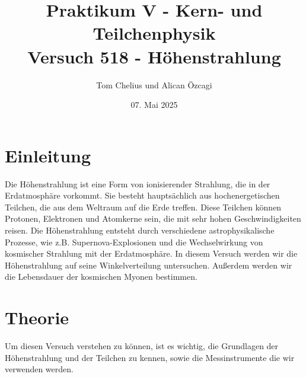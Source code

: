\documentclass{article}
\title{Praktikum V - Kern- und Teilchenphysik\\Versuch 518 - Höhenstrahlung}
\author{Tom Chelius und Alican Özcagi}
\date{07. Mai 2025}
\begin{document}
\maketitle
\newpage
\tableofcontents

\newpage

\section{Einleitung}
Die Höhenstrahlung ist eine Form von ionisierender Strahlung, die in der Erdatmosphäre vorkommt. 
Sie besteht hauptsächlich aus hochenergetischen Teilchen, die aus dem Weltraum auf die Erde treffen. 
Diese Teilchen können Protonen, Elektronen und Atomkerne sein, die mit sehr hohen Geschwindigkeiten reisen. 
Die Höhenstrahlung entsteht durch verschiedene astrophysikalische Prozesse, wie z.B. Supernova-Explosionen und 
die Wechselwirkung von kosmischer Strahlung mit der Erdatmosphäre.
In diesem Versuch werden wir die Höhenstrahlung auf seine Winkelverteilung untersuchen.
Außerdem werden wir die Lebensdauer der kosmischen Myonen bestimmen.

\section{Theorie}
Um diesen Versuch verstehen zu können, ist es wichtig, die Grundlagen der Höhenstrahlung und der Teilchen zu kennen, sowie die 
Messinstrumente die wir verwenden werden. 
\end{document}
